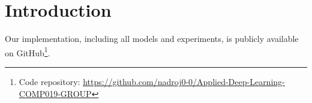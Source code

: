 \section{Introduction}


Our implementation, including all models and experiments, is publicly available on GitHub\footnote{Code repository: \url{https://github.com/nadroj0-0/Applied-Deep-Learning-COMP019-GROUP}}.